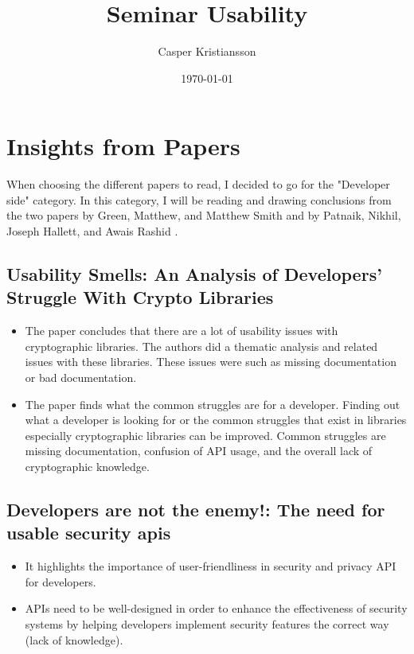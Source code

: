 \documentclass{article}
\title{Seminar Usability}
\author{Casper Kristiansson}
\date{\today}
\begin{document}
\maketitle

\section{Insights from Papers}
When choosing the different papers to read, I decided to go for the "Developer side" category. In this category, I will be reading and drawing conclusions from the two papers   by Green, Matthew, and Matthew Smith \cite{developersAreNot} and  by Patnaik, Nikhil, Joseph Hallett, and Awais Rashid \cite{usabilitySmells}.

\subsection{Usability Smells: An Analysis of Developers’ Struggle With Crypto Libraries}
\begin{itemize}
    \item The paper concludes that there are a lot of usability issues with cryptographic libraries. The authors did a thematic analysis and related issues with these libraries. These issues were such as missing documentation or bad documentation.
    \item The paper finds what the common struggles are for a developer. Finding out what a developer is looking for or the common struggles that exist in libraries especially cryptographic libraries can be improved. Common struggles are missing documentation, confusion of API usage, and the overall lack of cryptographic knowledge.
\end{itemize}

\subsection{Developers are not the enemy!: The need for usable security apis}
\begin{itemize}
    \item It highlights the importance of user-friendliness in security and privacy API for developers.
    \item APIs need to be well-designed in order to enhance the effectiveness of security systems by helping developers implement security features the correct way (lack of knowledge).
\end{itemize}
\end{document}
